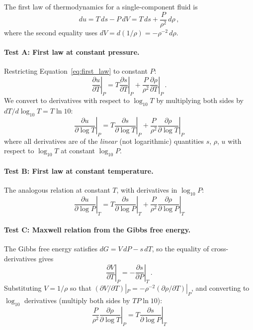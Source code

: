 \documentclass[twocolumn]{aastex701}
\begin{document}
The first law of thermodynamics for a single-component fluid is
\begin{equation}\label{eq:first_law}
    du = T\,ds - P\,dV = T\,ds + \frac{P}{\rho^2}\,d\rho\,,
\end{equation}
where the second equality uses $dV = d(1/\rho) = -\rho^{-2}\,d\rho$.

\paragraph{Test A: First law at constant pressure.}
Restricting Equation~\eqref{eq:first_law} to constant $P$:
\begin{equation}\label{eq:first_law_constP}
    \left.\frac{\partial u}{\partial T}\right|_P
    = T \left.\frac{\partial s}{\partial T}\right|_P
    + \frac{P}{\rho^2} \left.\frac{\partial \rho}{\partial T}\right|_P \,.
\end{equation}
We convert to derivatives with respect to $\log_{10} T$ by multiplying both sides by $dT/d\!\log_{10}\!T = T \ln 10$:
\begin{equation}\label{eq:test_A}
    \boxed{
    \left.\frac{\partial u}{\partial \log T}\right|_P
    = T \left.\frac{\partial s}{\partial \log T}\right|_P
    + \frac{P}{\rho^2} \left.\frac{\partial \rho}{\partial \log T}\right|_P
    }
\end{equation}
where all derivatives are of the \emph{linear} (not logarithmic) quantities $s$, $\rho$, $u$ with respect to $\log_{10} T$ at constant $\log_{10} P$.

\paragraph{Test B: First law at constant temperature.}
The analogous relation at constant $T$, with derivatives in $\log_{10} P$:
\begin{equation}\label{eq:test_B}
    \boxed{
    \left.\frac{\partial u}{\partial \log P}\right|_T
    = T \left.\frac{\partial s}{\partial \log P}\right|_T
    + \frac{P}{\rho^2} \left.\frac{\partial \rho}{\partial \log P}\right|_T
    }
\end{equation}

\paragraph{Test C: Maxwell relation from the Gibbs free energy.}
The Gibbs free energy satisfies $dG = V\,dP - s\,dT$, so the equality of cross-derivatives gives
\begin{equation}
    \left.\frac{\partial V}{\partial T}\right|_P
    = -\left.\frac{\partial s}{\partial P}\right|_T \,.
\end{equation}
Substituting $V = 1/\rho$ so that $(\partial V/\partial T)|_P = -\rho^{-2}(\partial\rho/\partial T)|_P$, and converting to $\log_{10}$ derivatives (multiply both sides by $TP\ln 10$):
\begin{equation}\label{eq:test_C}
    \boxed{
    \frac{P}{\rho^2} \left.\frac{\partial \rho}{\partial \log T}\right|_P
    = T \left.\frac{\partial s}{\partial \log P}\right|_T
    }
\end{equation}
\end{document}
